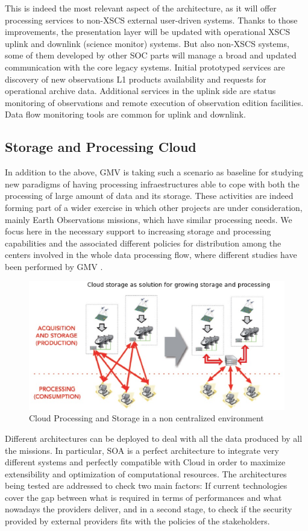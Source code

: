This is indeed the most relevant aspect of the architecture, as it will offer processing services to non-XSCS external user-driven systems. Thanks to those improvements, the presentation layer will be updated with operational XSCS uplink and downlink (science monitor) systems. But also non-XSCS systems, some of them developed by other SOC parts will manage a broad and updated communication with the core legacy systems. Initial prototyped services are discovery of new observations L1 products availability and requests for operational archive data. Additional services in the uplink side are status monitoring of observations and remote execution of observation edition facilities. Data flow monitoring tools are common for uplink and downlink. 
\subsection{Storage and Processing Cloud}
In addition to the above, GMV is taking such a scenario as baseline for studying  new paradigms of having processing infraestructures  able to cope with both the processing of large amount of data and its storage.
These activities  are indeed forming part of a wider exercise in which other projects are under 
consideration, mainly Earth Observations missions, which have similar processing needs. We focus here in the necessary support to increasing storage and processing capabilities and the 
associated different policies for distribution among the centers involved in the whole data processing flow, where different studies have been performed by GMV \cite{RubenPerez1}.
\begin{figure}[h]
\centering
\includegraphics[width=80 mm]{part10/Perez_P022/P022_f3.eps}
\caption{Cloud Processing and Storage in a non centralized environment}

\end{figure}
Different architectures can be deployed to deal with all the data
produced by all the missions. In particular, SOA is a perfect architecture to integrate very different systems and perfectly compatible with Cloud in order to maximize extensibility and optimization of computational resources. The architectures being tested are addressed to check two main factors: If current technologies cover the gap between what is required in terms of
performances and what nowadays the providers deliver, and in a second stage, to check
if the security provided by external providers fits with the policies of the stakeholders.

